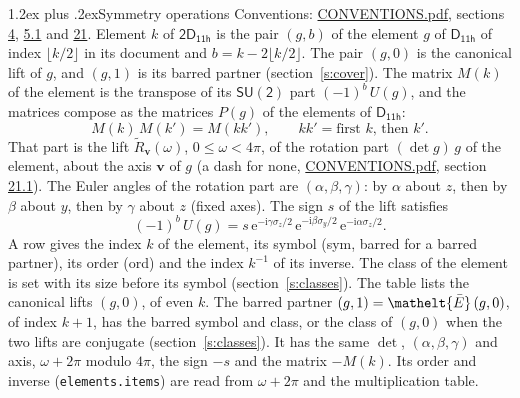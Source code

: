 \documentclass[10pt,a4paper]{article}
\makeatletter
\renewcommand\section{\@startsection{section}{1}{\z@}{-3ex plus -1ex minus -.2ex}%
  {1.2ex plus .2ex}{\normalfont\large\sffamily\bfseries\color{parttitle}}}
\numberwithin{equation}{section}
\newcommand{\eltfont}[1]{{\let\sigma\eltsigma\mathelt{#1}}}
\newcommand{\grp}[1]{\mathsf{#1}}
\newcommand{\elt}[1]{\eltfont{#1}}
\newcommand{\vv}{\mathbf{v}}
\newcommand{\iunit}{\mathrm{i}}
\newcommand{\expe}{\mathrm{e}}
\newcommand{\barred}[1]{\bar{#1}}
\newcommand{\lift}[1]{\tilde{#1}}
\newcommand{\pauli}[1]{\sigma_{#1}}
\makeatother
\begin{document}
\section{Symmetry operations}\label{s:elements}
Conventions: \href{../../CONVENTIONS.pdf}{CONVENTIONS.pdf}, sections \href{../../../rotation/CONVENTIONS.pdf\#conv.4}{4}, \href{../../../rotation/CONVENTIONS.pdf\#conv.5.1}{5.1} and \href{../../CONVENTIONS.pdf\#conv.21}{21}.
\leavevmode\label{n:index.element}\label{n:element.g}Element $k$ of $\grp{2D_{11h}}$ is the pair $(g, b)$ of the element $g$ of \href{../../../rotation/data/pdf/D11h.pdf}{$\grp{D_{11h}}$} of index $\lfloor k/2\rfloor$ in its document and $b = k - 2\lfloor k/2\rfloor$. The pair $(g, 0)$ is the canonical lift of $g$, and $(g, 1)$ is its barred partner (section~\ref{s:cover}). \label{n:matrix.element.pin}\label{n:matrix.element}The matrix $M(k)$ of the element is the transpose of its $\grp{SU(2)}$ part $(-1)^{b}\,U(g)$, and the matrices compose as the matrices $P(g)$ of the elements of $\grp{D_{11h}}$:
\begin{equation}\label{e:mprod}M(k)\,M(k') = M(kk'),\qquad kk' = \text{first } k\text{, then } k'.\end{equation}
\leavevmode\label{n:angle.omega}\label{n:vector.axis}\label{n:vector.pole}That part is the lift $\lift{R}_{\vv}(\omega)$, $0 \le \omega < 4\pi$, of the rotation part $(\det g)\,g$ of the element, about the axis $\vv$ of $g$ (a dash for none, \href{../../CONVENTIONS.pdf}{CONVENTIONS.pdf}, section \href{../../CONVENTIONS.pdf\#conv.21.1}{21.1}). \label{n:angle.euler.alpha}\label{n:angle.euler.beta}\label{n:angle.euler.gamma}\label{n:vector.coordinates}The Euler angles of the rotation part are $(\alpha,\beta,\gamma)$: by $\alpha$ about $z$, then by $\beta$ about $y$, then by $\gamma$ about $z$ (fixed axes). \label{n:local.euler.sign}The sign $s$ of the lift satisfies
\begin{equation}\label{e:euler}(-1)^{b}\,U(g) = s\,\expe^{-\iunit\gamma\pauli{z}/2}\,\expe^{-\iunit\beta\pauli{y}/2}\,\expe^{-\iunit\alpha\pauli{z}/2}.\end{equation}
\leavevmode\label{n:index.element.inverse}\label{n:head.sym}\label{n:head.ord}A row gives the index $k$ of the element, its symbol (sym, barred for a barred partner), its order (ord) and the index $k^{-1}$ of its inverse. \label{n:head.class}The class of the element is set with its size before its symbol (section~\ref{s:classes}).
The table lists the canonical lifts $(g, 0)$, of even $k$. The barred partner $(g, 1) = \elt{\barred{E}}\,(g, 0)$, of index $k + 1$, has the barred symbol and class, or the class of $(g, 0)$ when the two lifts are conjugate (section~\ref{s:classes}). It has the same $\det$, $(\alpha,\beta,\gamma)$ and axis, $\omega + 2\pi$ modulo $4\pi$, the sign $-s$ and the matrix $-M(k)$. Its order and inverse (\texttt{elements.items}) are read from $\omega + 2\pi$ and the multiplication table.
\end{document}
